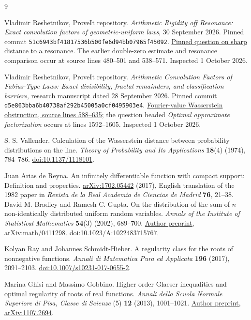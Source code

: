 \documentclass[11pt,letterpaper]{article}
\theoremstyle{remark}\newtheorem{remark}[theorem]{Remark}
\begin{document}
\clearpage
\begin{thebibliography}{9}\raggedright
{}
Vladimir Reshetnikov, ProveIt repository.
\emph{Arithmetic Rigidity off Resonance: Exact convolution factors of geometric-uniform laws}, 30 September 2026.
Pinned commit \nolinkurl{51c6943bf41817536b500fe6d94bb07965f45092}.
\href{https://github.com/VladimirReshetnikov/ProveIt/blob/51c6943bf41817536b500fe6d94bb07965f45092/Analysis/FabiusFunction/docs/semi-formalized-research-frontiers/drafts/spectra-and-arithmetic/Arithmetic_Rigidity_off_Resonance_Geometric_Uniform_Laws/article.tex#L748-L751}{Pinned question on sharp distance to a resonance}.
The earlier double-zero estimate and resonance comparison occur at source lines 480--501 and 538--571.
Inspected 1 October 2026.

Vladimir Reshetnikov, ProveIt repository.
\emph{Arithmetic Convolution Factors of Fabius-Type Laws: Exact divisibility, fractal remainders, and classification barriers}, research manuscript dated 28 September 2026.
Pinned commit \nolinkurl{d5e863bba6b40738af292b45005a0cf0495903e4}.
\href{https://github.com/VladimirReshetnikov/ProveIt/blob/d5e863bba6b40738af292b45005a0cf0495903e4/Analysis/FabiusFunction/docs/semi-formalized-research-frontiers/drafts/spectra-and-arithmetic/Arithmetic_Convolution_Factors_Fabius_Type_Laws/article.tex#L588-L635}{Fourier-value Wasserstein obstruction, source lines 588--635}; the question headed \emph{Optimal approximate factorization} occurs at lines 1592--1605. Inspected 1 October 2026.

S. S. Vallender.
Calculation of the Wasserstein distance between probability distributions on the line.
\emph{Theory of Probability and Its Applications} \textbf{18}(4) (1974), 784--786.
\href{https://doi.org/10.1137/1118101}{doi:10.1137/1118101}.

Juan Arias de Reyna.
An infinitely differentiable function with compact support: Definition and properties.
\href{https://arxiv.org/abs/1702.05442}{arXiv:1702.05442} (2017), English translation of the 1982 paper in \emph{Revista de la Real Academia de Ciencias de Madrid} \textbf{76}, 21--38.
David M. Bradley and Ramesh C. Gupta.
On the distribution of the sum of $n$ non-identically distributed uniform random variables.
\emph{Annals of the Institute of Statistical Mathematics} \textbf{54}(3) (2002), 689--700.
\href{https://arxiv.org/abs/math/0411298}{Author preprint, arXiv:math/0411298}.
\href{https://doi.org/10.1023/A:1022483715767}{doi:10.1023/A:1022483715767}.

Kolyan Ray and Johannes Schmidt-Hieber.
A regularity class for the roots of nonnegative functions.
\emph{Annali di Matematica Pura ed Applicata} \textbf{196} (2017), 2091--2103.
\href{https://doi.org/10.1007/s10231-017-0655-2}{doi:10.1007/s10231-017-0655-2}.

Marina Ghisi and Massimo Gobbino.
Higher order Glaeser inequalities and optimal regularity of roots of real functions.
\emph{Annali della Scuola Normale Superiore di Pisa, Classe di Scienze} (5) \textbf{12} (2013), 1001--1021.
\href{https://arxiv.org/abs/1107.2694}{Author preprint, arXiv:1107.2694}.
\end{thebibliography}
\end{document}
